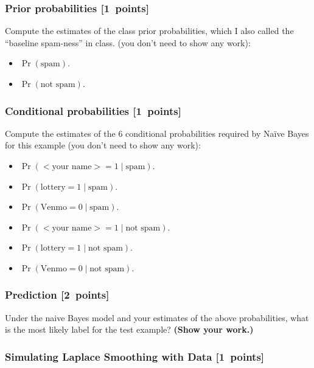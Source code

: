 \documentclass{article}
\newcommand{\blu}[1]{{\textcolor{blu}{#1}}}
\let\ask\blu
\newcommand\pts[1]{\textcolor{pointscolour}{[#1~points]}}
\begin{document}
    \subsubsection{Prior probabilities \pts{1}}
    \ask{Compute the estimates of the class prior probabilities, which I also called the ``baseline spam-ness'' in class.} (you don't need to show any work):
    \begin{itemize}
        \item $\Pr(\text{spam})$.
        \item $\Pr(\text{not spam})$.
    \end{itemize}

    \subsubsection{Conditional probabilities \pts{1}}

    \ask{Compute the estimates of the 6 conditional probabilities required by Na\"ive Bayes for this example}  (you don't need to show any work):
    \begin{itemize}
        \item $\Pr(\text{$<$your name$>$} = 1  \mid \text{spam})$.
        \item $\Pr(\text{lottery} = 1 \mid \text{spam})$.
        \item $\Pr(\text{Venmo} = 0  \mid \text{spam})$.
        \item $\Pr(\text{$<$your name$>$} = 1  \mid \text{not spam})$.
        \item $\Pr(\text{lottery} = 1  \mid \text{not spam})$.
        \item $\Pr(\text{Venmo} = 0  \mid \text{not spam})$.
    \end{itemize}

    \subsubsection{Prediction \pts{2}}

    \ask{Under the naive Bayes model and your estimates of the above probabilities, what is the most likely label for the test example? \textbf{(Show your work.)}}

    \subsubsection{Simulating Laplace Smoothing with Data \pts{1}}
    \label{laplace.conceptual}
\end{document}
